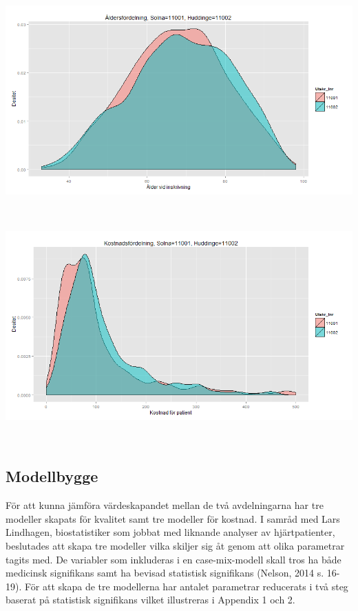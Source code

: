 \noindent\begin{minipage}{\textwidth}
\centering
\includegraphics[width=1\textwidth]{alder.png}
\label{fig:alder}            
\end{minipage}
\\

\noindent\begin{minipage}{\textwidth}
\centering
\includegraphics[width=1\textwidth]{kostnad.png}
\label{fig:kostnad}            
\end{minipage}
\\

\subsection{Modellbygge}

För att kunna jämföra värdeskapandet mellan de två avdelningarna har tre modeller skapats för kvalitet samt tre modeller för kostnad. I samråd med Lars Lindhagen, biostatistiker som jobbat med liknande analyser av hjärtpatienter, beslutades att skapa tre modeller vilka skiljer sig åt genom att olika parametrar tagits med. De variabler som inkluderas i en case-mix-modell skall tros ha både medicinsk signifikans samt ha bevisad statistisk signifikans (Nelson, 2014 s. 16-19). För att skapa de tre modellerna har antalet parametrar reducerats i två steg baserat på statistisk signifikans vilket illustreras i Appendix 1 och 2.

